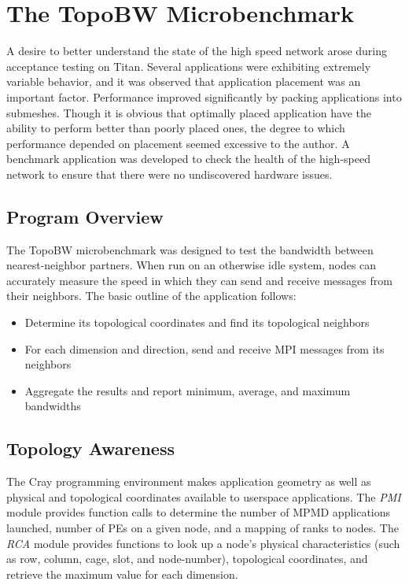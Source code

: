 \documentclass[10pt, conference, compsocconf]{IEEEtran}
\begin{document}
\section{The TopoBW Microbenchmark}

A desire to better understand the state of the high speed network arose during
acceptance testing on Titan.  Several applications were exhibiting extremely
variable behavior, and it was observed that application placement was an
important factor.  Performance improved significantly by packing applications
into submeshes.  Though it is obvious that optimally placed application have
the ability to perform better than poorly placed ones, the degree to which
performance depended on placement seemed excessive to the author.  A benchmark
application was developed to check the health of the high-speed network to
ensure that there were no undiscovered hardware issues.

\subsection{Program Overview}

The TopoBW microbenchmark was designed to test the bandwidth between
nearest-neighbor partners.  When run on an otherwise idle system, nodes can
accurately measure the speed in which they can send and receive messages from
their neighbors.  The basic outline of the application follows:

\begin{itemize}
	\item Determine its topological coordinates and find its topological neighbors
	\item For each dimension and direction, send and receive MPI messages from its neighbors
	\item Aggregate the results and report minimum, average, and maximum bandwidths
\end{itemize}

\subsection{Topology Awareness}

The Cray programming environment makes application geometry as well as physical
and topological coordinates available to userspace applications.  The
\emph{PMI} module provides function calls to determine the number of MPMD
applications launched, number of PEs on a given node, and a mapping of ranks to
nodes.  The \emph{RCA} module provides functions to look up a node's physical
characteristics (such as row, column, cage, slot, and node-number), topological
coordinates, and retrieve the maximum value for each dimension.
\end{document}
